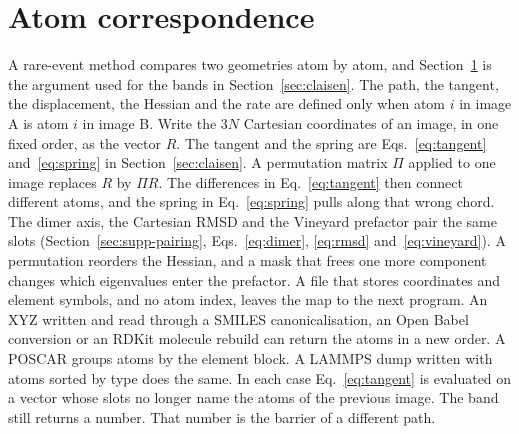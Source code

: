 \section{Atom correspondence}\label{sec:identity}
A rare-event method compares two geometries atom by atom, and Section~\ref{sec:identity} is the argument used for the bands in Section~\ref{sec:claisen}.
The path, the tangent, the displacement, the Hessian and the rate are defined only when atom \(i\) in image A is atom \(i\) in image B.
Write the \(3N\) Cartesian coordinates of an image, in one fixed order, as the vector \(R\).
The tangent and the spring are Eqs.~\eqref{eq:tangent} and~\eqref{eq:spring} in Section~\ref{sec:claisen}.
A permutation matrix \(\Pi\) applied to one image replaces \(R\) by \(\Pi R\).
The differences in Eq.~\eqref{eq:tangent} then connect different atoms, and the spring in Eq.~\eqref{eq:spring} pulls along that wrong chord.
The dimer axis, the Cartesian RMSD and the Vineyard prefactor pair the same slots (Section~\ref{sec:supp-pairing}, Eqs.~\eqref{eq:dimer}, \eqref{eq:rmsd} and~\eqref{eq:vineyard}).
A permutation reorders the Hessian, and a mask that frees one more component changes which eigenvalues enter the prefactor.
A file that stores coordinates and element symbols, and no atom index, leaves the map to the next program.
An XYZ written and read through a SMILES canonicalisation, an Open Babel conversion or an RDKit molecule rebuild can return the atoms in a new order.
A POSCAR groups atoms by the element block.
A LAMMPS dump written with atoms sorted by type does the same.
In each case Eq.~\eqref{eq:tangent} is evaluated on a vector whose slots no longer name the atoms of the previous image.
The band still returns a number.
That number is the barrier of a different path.
